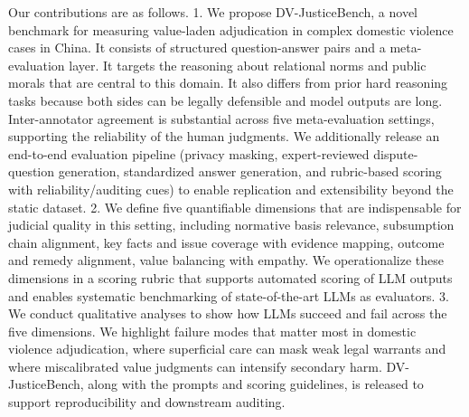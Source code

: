 \documentclass[pdflatex,sn-mathphys-ay]{sn-jnl}%
\theoremstyle{thmstyleone}%
\theoremstyle{thmstyletwo}%
\theoremstyle{thmstylethree}%
\begin{document}
Our contributions are as follows. 1. We propose DV-JusticeBench, a novel benchmark for measuring value-laden adjudication in complex domestic violence cases in China. It consists of structured question-answer pairs and a meta-evaluation layer. It targets the reasoning about relational norms and public morals that are central to this domain. It also differs from prior hard reasoning tasks because both sides can be legally defensible and model outputs are long. Inter-annotator agreement is substantial across five meta-evaluation settings, supporting the reliability of the human judgments. We additionally release an end-to-end evaluation pipeline (privacy masking, expert-reviewed dispute-question generation, standardized answer generation, and rubric-based scoring with reliability/auditing cues) to enable replication and extensibility beyond the static dataset. 2. We define five quantifiable dimensions that are indispensable for judicial quality in this setting, including normative basis relevance, subsumption chain alignment, key facts and issue coverage with evidence mapping, outcome and remedy alignment, value balancing with empathy. We operationalize these dimensions in a scoring rubric that supports automated scoring of LLM outputs and enables systematic benchmarking of state-of-the-art LLMs as evaluators. 3. We conduct qualitative analyses to show how LLMs succeed and fail across the five dimensions. We highlight failure modes that matter most in domestic violence adjudication, where superficial care can mask weak legal warrants and where miscalibrated value judgments can intensify secondary harm. DV-JusticeBench, along with the prompts and scoring guidelines, is released to support reproducibility and downstream auditing.
\end{document}

